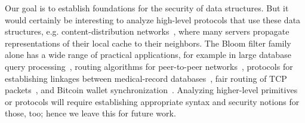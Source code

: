 %

Our goal is to establish foundations for the security of  data
structures. But it would certainly be interesting to analyze high-level
protocols that use these data structures, e.g.
content-distribution networks~\cite{byers2002informed}, where many servers
propagate representations of their local cache to their neighbors. The Bloom
filter family alone has a wide range of practical applications, for example in
large database query processing~\cite{broder2004network}, routing algorithms for
peer-to-peer networks~\cite{reynolds2003efficient}, protocols for establishing
linkages between medical-record databases~\cite{schnell2011novel}, fair routing
of TCP packets~\cite{feng2001stochastic}, and Bitcoin wallet
synchronization~\cite{gervais2014privacy}.
%
Analyzing higher-level primitives or protocols will require establishing
appropriate syntax and security notions for those, too; hence we leave this for
future work.



